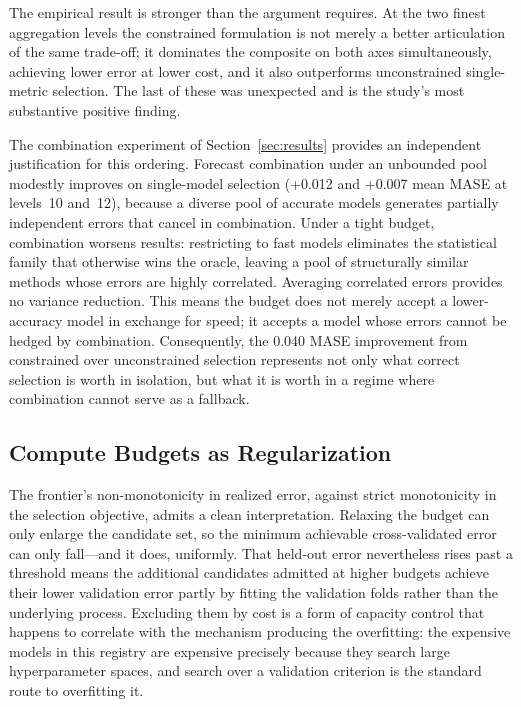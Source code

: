 The empirical result is stronger than the argument requires. At the two finest aggregation levels the constrained formulation is not merely a better articulation of the same trade-off; it dominates the composite on both axes simultaneously, achieving lower error at lower cost, and it also outperforms unconstrained single-metric selection. The last of these was unexpected and is the study's most substantive positive finding.

The combination experiment of Section~\ref{sec:results} provides an independent justification for this ordering. Forecast combination under an unbounded pool modestly improves on single-model selection (+0.012 and +0.007 mean MASE at levels~10 and~12), because a diverse pool of accurate models generates partially independent errors that cancel in combination. Under a tight budget, combination worsens results: restricting to fast models eliminates the statistical family that otherwise wins the oracle, leaving a pool of structurally similar methods whose errors are highly correlated. Averaging correlated errors provides no variance reduction. This means the budget does not merely accept a lower-accuracy model in exchange for speed; it accepts a model whose errors cannot be hedged by combination. Consequently, the 0.040 MASE improvement from constrained over unconstrained selection represents not only what correct selection is worth in isolation, but what it is worth in a regime where combination cannot serve as a fallback.

\subsection{Compute Budgets as Regularization}
The frontier's non-monotonicity in realized error, against strict monotonicity in the selection objective, admits a clean interpretation. Relaxing the budget can only enlarge the candidate set, so the minimum achievable cross-validated error can only fall---and it does, uniformly. That held-out error nevertheless rises past a threshold means the additional candidates admitted at higher budgets achieve their lower validation error partly by fitting the validation folds rather than the underlying process. Excluding them by cost is a form of capacity control that happens to correlate with the mechanism producing the overfitting: the expensive models in this registry are expensive precisely because they search large hyperparameter spaces, and search over a validation criterion is the standard route to overfitting it.


